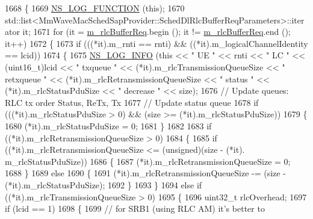 \begin{DoxyCode}
1668 \{
1669   \hyperlink{log-macros-disabled_8h_a90b90d5bad1f39cb1b64923ea94c0761}{NS\_LOG\_FUNCTION} (\textcolor{keyword}{this});
1670   std::list<MmWaveMacSchedSapProvider::SchedDlRlcBufferReqParameters>::iterator it;
1671   \textcolor{keywordflow}{for} (it = \hyperlink{classns3_1_1MmWaveFlexTtiMacScheduler_a2d166013dff600afe51e8c038c36db2b}{m\_rlcBufferReq}.begin (); it != \hyperlink{classns3_1_1MmWaveFlexTtiMacScheduler_a2d166013dff600afe51e8c038c36db2b}{m\_rlcBufferReq}.end (); it++)
1672   \{
1673         \textcolor{keywordflow}{if} (((*it).m\_rnti == rnti) && ((*it).m\_logicalChannelIdentity == lcid))
1674         \{
1675                 \hyperlink{group__logging_gafbd73ee2cf9f26b319f49086d8e860fb}{NS\_LOG\_INFO} (\textcolor{keyword}{this} << \textcolor{stringliteral}{" UE "} << rnti << \textcolor{stringliteral}{" LC "} << (uint16\_t)lcid << \textcolor{stringliteral}{" txqueue "} 
      << (*it).m\_rlcTransmissionQueueSize << \textcolor{stringliteral}{" retxqueue "} << (*it).m\_rlcRetransmissionQueueSize << \textcolor{stringliteral}{" status "} << 
      (*it).m\_rlcStatusPduSize << \textcolor{stringliteral}{" decrease "} << size);
1676                 \textcolor{comment}{// Update queues: RLC tx order Status, ReTx, Tx}
1677                 \textcolor{comment}{// Update status queue}
1678                 \textcolor{keywordflow}{if} (((*it).m\_rlcStatusPduSize > 0) && (size >= (*it).m\_rlcStatusPduSize))
1679                 \{
1680                         (*it).m\_rlcStatusPduSize = 0;
1681                 \}
1682 
1683                 \textcolor{keywordflow}{if} ((*it).m\_rlcRetransmissionQueueSize > 0)
1684                 \{
1685                         \textcolor{keywordflow}{if} ((*it).m\_rlcRetransmissionQueueSize <= (\textcolor{keywordtype}{unsigned})(size - (*it).
      m\_rlcStatusPduSize))
1686                         \{
1687                                 (*it).m\_rlcRetransmissionQueueSize = 0;
1688                         \}
1689                         \textcolor{keywordflow}{else}
1690                         \{
1691                                 (*it).m\_rlcRetransmissionQueueSize -= (size - (*it).m\_rlcStatusPduSize);
1692                         \}
1693                 \}
1694                 \textcolor{keywordflow}{else} \textcolor{keywordflow}{if} ((*it).m\_rlcTransmissionQueueSize > 0)
1695                 \{
1696                         uint32\_t rlcOverhead;
1697                         \textcolor{keywordflow}{if} (lcid == 1)
1698                         \{
1699                                 \textcolor{comment}{// for SRB1 (using RLC AM) it's better to}

\end{DoxyCode}
